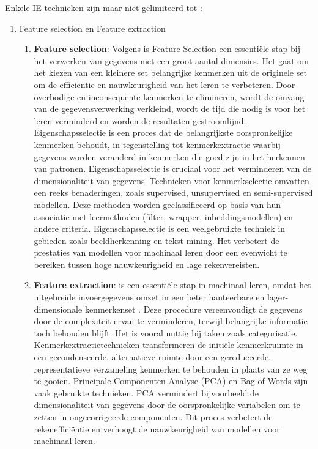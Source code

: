 Enkele IE technieken zijn maar niet gelimiteerd tot \autocite{IBM2024}:
\begin{enumerate}
    \item Feature selection en Feature extraction
    \begin{enumerate}
        \item \textbf{Feature selection}: Volgens  \textcite{CAI201870} is Feature Selection een essentiële stap bij het verwerken van gegevens met een groot aantal dimensies. Het gaat om het kiezen van een kleinere set belangrijke kenmerken uit de originele set om de efficiëntie en nauwkeurigheid van het leren te verbeteren. Door overbodige en inconsequente kenmerken te elimineren, wordt de omvang van de gegevensverwerking verkleind, wordt de tijd die nodig is voor het leren verminderd en worden de resultaten gestroomlijnd. Eigenschapsselectie is een proces dat de belangrijkste oorspronkelijke kenmerken behoudt, in tegenstelling tot kenmerkextractie waarbij gegevens worden veranderd in kenmerken die goed zijn in het herkennen van patronen. Eigenschapsselectie is cruciaal voor het verminderen van de dimensionaliteit van gegevens. Technieken voor kenmerkselectie omvatten een reeks benaderingen, zoals supervised, unsupervised en semi-supervised modellen. Deze methoden worden geclassificeerd op basis van hun associatie met leermethoden (filter, wrapper, inbeddingsmodellen) en andere criteria. Eigenschapsselectie is een veelgebruikte techniek in gebieden zoals beeldherkenning en tekst mining. Het verbetert de prestaties van modellen voor machinaal leren door een evenwicht te bereiken tussen hoge nauwkeurigheid en lage rekenvereisten.
        \item \textbf{Feature extraction}: is een essentiële stap in machinaal leren, omdat het uitgebreide invoergegevens omzet in een beter hanteerbare en lager-dimensionale kenmerkenset \autocite{Mustazzihim}. Deze procedure vereenvoudigt de gegevens door de complexiteit ervan te verminderen, terwijl belangrijke informatie toch behouden blijft. Het is vooral nuttig bij taken zoals categorisatie. Kenmerkextractietechnieken transformeren de initiële kenmerkruimte in een gecondenseerde, alternatieve ruimte door een gereduceerde, representatieve verzameling kenmerken te behouden in plaats van ze weg te gooien. Principale Componenten Analyse (PCA) en Bag of Words zijn vaak gebruikte technieken. PCA vermindert bijvoorbeeld de dimensionaliteit van gegevens door de oorspronkelijke variabelen om te zetten in ongecorrigeerde componenten. Dit proces verbetert de rekenefficiëntie en verhoogt de nauwkeurigheid van modellen voor machinaal leren.

\end{enumerate}
\end{enumerate}
